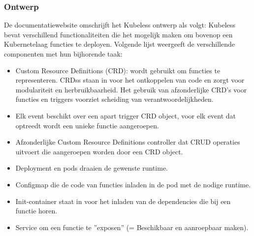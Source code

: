 \subsubsection{Ontwerp}
De \textcite{Kubeless2019} documentatiewebsite omschrijft het Kubeless ontwerp als volgt: Kubeless bevat verschillend functionaliteiten die het mogelijk maken om bovenop een Kubernetelaag functies te deployen. Volgende lijst weergeeft de verschillende componenten met hun bijhorende taak:
\begin{itemize}
    \item Custom Resource Definitions (CRD): wordt gebruikt om functies te representeren. CRDss staan in voor het ontkoppelen van code en zorgt voor modulariteit en herbruikbaarheid. Het gebruik van afzonderlijke CRD's voor functies en triggers voorziet scheiding van verantwoordelijkheden.
    \item Elk event beschikt over een apart trigger CRD object, voor elk event dat optreedt wordt een unieke functie aangeroepen.
    \item Afzonderlijke Custom Resource Definitions controller dat CRUD operaties uitvoert die aangeroepen worden door een CRD object.
    \item Deployment en pods draaien de gewenste runtime.
    \item Configmap die de code van functies inladen in de pod met de nodige runtime.
    \item Init-container staat in voor het inladen van de dependencies die bij een functie horen.
    \item Service om een functie te ''exposen'' (= Beschikbaar en aanroepbaar maken).
\end{itemize}

